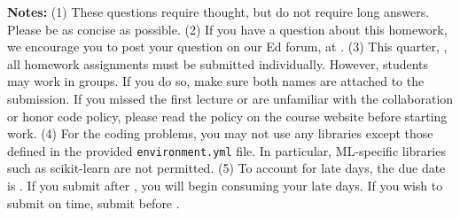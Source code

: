 {\bf Notes:} 
(1) These questions require thought, but do not require long
answers. Please be as concise as possible.  
(2) If you have a question
about this homework, we encourage you to post your question on our
Ed forum, at \edstem. 
(3) This quarter, \qtr, all homework assignments must be submitted individually.
However, students may work in groups. If you do so, make sure both names are attached to the submission. 
If you missed the first lecture or are unfamiliar with the collaboration or honor
code policy, please read the policy on the course website before starting work.
(4) For the coding problems, you may not
use any libraries except those defined in the provided \texttt{environment.yml}
file. In particular, ML-specific libraries such as scikit-learn are not
permitted. 
(5) To account for late days, the due date is \due. If you submit after
\due, you will begin consuming your
late days. If you wish to submit on time, submit before \due.

